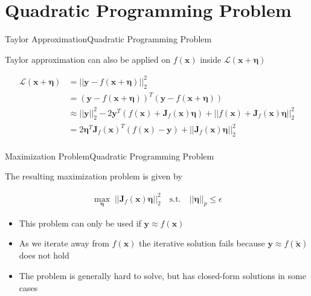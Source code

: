 \documentclass[xcolor={cmyk}]{beamer}
\newcommand{\mcl}{\mathcal}
\newcommand{\bm}{\boldsymbol}
\begin{document}
\section{Quadratic Programming Problem}

\begin{frame}{Taylor Approximation}{Quadratic Programming Problem}

	Taylor approximation can also be applied on $f(\bm{x})$ inside $\mcl{L}(\bm{x}+\bm{\eta})$

	\begin{equation*}
	\begin{aligned}
	\mcl{L}(\bm{x} + \bm{\eta}) &= \lvert\lvert \bm{y} - f(\bm{x} + \bm{\eta}) \rvert\rvert^2_2 \\[10pt]
	&= (\bm{y} - f(\bm{x} + \bm{\eta}))^T(\bm{y} - f(\bm{x} + \bm{\eta})) \\[10pt]
	&\approx \lvert\lvert \bm{y} \rvert\rvert^2_2 - 2 \bm{y}^T (f(\bm{x}) + \bm{J}_f(\bm{x})\bm{\eta}) + \lvert\lvert f(\bm{x}) + \bm{J}_f(\bm{x}) \bm{\eta} \rvert\rvert^2_2 \\[10pt]
	&= 2 \bm{\eta}^T \bm{J}_f(\bm{x})^T (f(\bm{x}) - \bm{y}) + \lvert\lvert \bm{J}_f(\bm{x}) \bm{\eta} \rvert\rvert^2_2 \\
	\end{aligned}
	\end{equation*}
\end{frame}

\begin{frame}{Maximization Problem}{Quadratic Programming Problem}

	The resulting maximization problem is given by

	\begin{equation*}
	\begin{aligned}
		\max_{\bm{\eta}} \; \lvert\lvert \bm{J}_f(\bm{x}) \bm{\eta} \rvert\rvert_2^2 \quad \text{s.t.} \quad \lvert\lvert \bm{\eta} \rvert\rvert_p \leq \epsilon
	\end{aligned}
	\label{quadintro}
	\end{equation*}

	\begin{itemize}
		\item This problem can only be used if $\bm{y} \approx f(\bm{x})$
		\item As we iterate away from $f(\bm{x})$ the iterative solution fails because $\bm{y} \approx f(\bm{\tilde{x}})$ does not hold
		\item The problem is generally hard to solve, but has closed-form solutions in some cases
	\end{itemize}

\end{frame}
\end{document}

